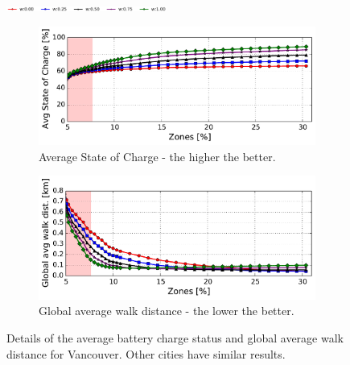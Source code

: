 \begin{figure}[t!]
    \begin{center}
	    \includegraphics[width=0.47\textwidth]{figures/legenda.pdf}
    \vspace{-0.1cm}
    \end{center}
    \begin{center}
        \begin{subfigure}{0.47\textwidth}
            \includegraphics[width=\columnwidth]{figures/cut_Vancouver_AvgSOCVsZones_Policy_44_tt-25_100_4.pdf}
            \caption{Average State of Charge - the higher the better.}
            \label{fig:zone_vs_soc_vancouver}
        \end{subfigure}
         \begin{subfigure}{0.47\textwidth}
            \includegraphics[width=\columnwidth]{figures/cut_Vancouver_TravelWithPenlatyVsZones_Policy_44_tt-25_100_4.pdf}
             \caption{Global average walk distance - the lower the better.}
             \label{fig:zone_vs_wwd_vancouver}
         \end{subfigure}
         \caption{Details of the average battery charge status and global average walk distance for Vancouver. Other cities have similar results.}
         \label{fig:discomoft_metrics_vancouver}
\end{center}
\end{figure}



